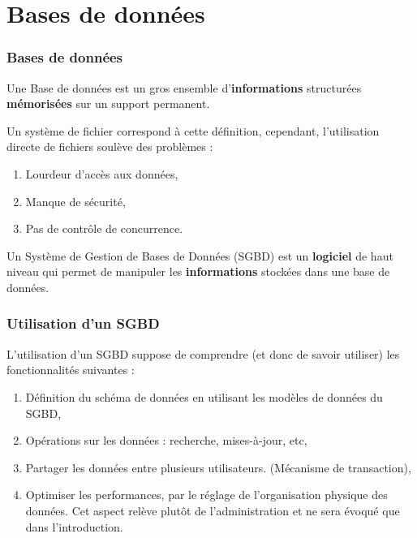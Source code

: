 
\section{Bases de données} 

\begin{frame}[fragile]
\frametitle{Bases de données}

\begin{defi}
Une Base de données est un gros ensemble d'\textbf{informations} structurées \textbf{mémorisées} sur un
support permanent.
\end{defi}

Un système de fichier correspond à cette définition, cependant, l'utilisation directe de fichiers
soulève des problèmes :\vspace{-0.4cm}

\begin{enumerate}
 \item Lourdeur d'accès aux données,
 \item Manque de sécurité,
 \item Pas de contrôle de concurrence.
\end{enumerate}

\begin{defi}
Un Système de Gestion de Bases de Données (SGBD) est un \textbf{logiciel} de haut niveau qui
permet de manipuler les \textbf{informations} stockées dans une base de données.
\end{defi}

\end{frame}

\begin{frame}[fragile]
\frametitle{Utilisation d'un SGBD}

L'utilisation d'un SGBD suppose de comprendre (et donc de savoir utiliser) les fonctionnalités suivantes :
\begin{enumerate}
 \item Définition du schéma de données en utilisant les modèles de données du SGBD,
 \item Opérations sur les données : recherche, mises-à-jour, etc,
 \item Partager les données entre plusieurs utilisateurs. (Mécanisme de transaction),
 \item Optimiser les performances, par le réglage de l'organisation physique des données. Cet aspect relève plutôt de l'administration et ne sera évoqué que dans l'introduction.
\end{enumerate}
\end{frame}

